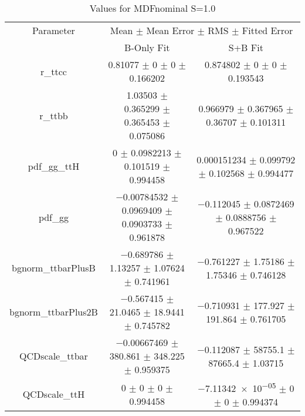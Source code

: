 \begin{table}
\centering
\caption{Values for MDFnominal S=1.0}
\begin{tabular}{ccc}
\toprule
Parameter & \multicolumn{2}{c}{Mean $\pm$ Mean Error $\pm$ RMS $\pm$ Fitted Error}\\
 & B-Only Fit & S+B Fit\\
\midrule
r\_ttcc & \num{0.81077} $\pm$ \num{0} $\pm$ \num{0} $\pm$ \num{0.166202} & \num{0.874802} $\pm$ \num{0} $\pm$ \num{0} $\pm$ \num{0.193543}\\
r\_ttbb & \num{1.03503} $\pm$ \num{0.365299} $\pm$ \num{0.365453} $\pm$ \num{0.075086} & \num{0.966979} $\pm$ \num{0.367965} $\pm$ \num{0.36707} $\pm$ \num{0.101311}\\
pdf\_gg\_ttH & \num{0} $\pm$ \num{0.0982213} $\pm$ \num{0.101519} $\pm$ \num{0.994458} & \num{0.000151234} $\pm$ \num{0.099792} $\pm$ \num{0.102568} $\pm$ \num{0.994477}\\
pdf\_gg & \num{-0.00784532} $\pm$ \num{0.0969409} $\pm$ \num{0.0903733} $\pm$ \num{0.961878} & \num{-0.112045} $\pm$ \num{0.0872469} $\pm$ \num{0.0888756} $\pm$ \num{0.967522}\\
bgnorm\_ttbarPlusB & \num{-0.689786} $\pm$ \num{1.13257} $\pm$ \num{1.07624} $\pm$ \num{0.741961} & \num{-0.761227} $\pm$ \num{1.75186} $\pm$ \num{1.75346} $\pm$ \num{0.746128}\\
bgnorm\_ttbarPlus2B & \num{-0.567415} $\pm$ \num{21.0465} $\pm$ \num{18.9441} $\pm$ \num{0.745782} & \num{-0.710931} $\pm$ \num{177.927} $\pm$ \num{191.864} $\pm$ \num{0.761705}\\
QCDscale\_ttbar & \num{-0.00667469} $\pm$ \num{380.861} $\pm$ \num{348.225} $\pm$ \num{0.959375} & \num{-0.112087} $\pm$ \num{58755.1} $\pm$ \num{87665.4} $\pm$ \num{1.03715}\\
QCDscale\_ttH & \num{0} $\pm$ \num{0} $\pm$ \num{0} $\pm$ \num{0.994458} & \num{-7.11342e-05} $\pm$ \num{0} $\pm$ \num{0} $\pm$ \num{0.994374}\\
\bottomrule
\end{tabular}
\end{table}